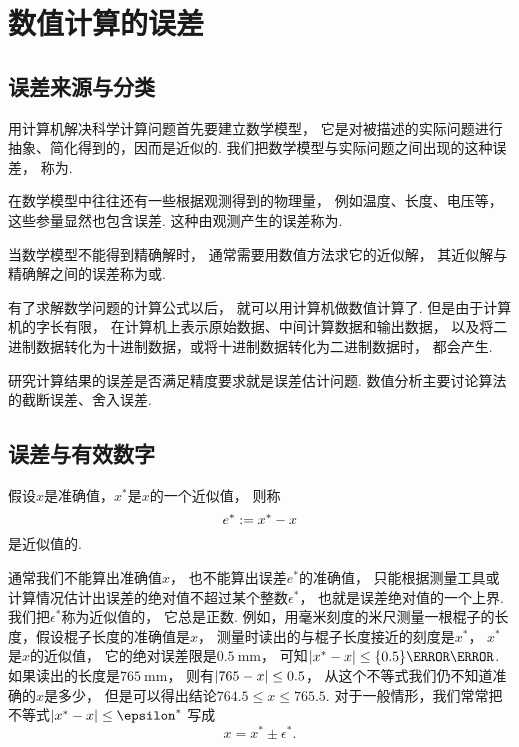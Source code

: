 \section{数值计算的误差}
\subsection{误差来源与分类}
用计算机解决科学计算问题首先要建立数学模型，
它是对被描述的实际问题进行抽象、简化得到的，因而是近似的.
我们把数学模型与实际问题之间出现的这种误差，
称为.

在数学模型中往往还有一些根据观测得到的物理量，
例如温度、长度、电压等，
这些参量显然也包含误差.
这种由观测产生的误差称为.

当数学模型不能得到精确解时，
通常需要用数值方法求它的近似解，
其近似解与精确解之间的误差称为或.

有了求解数学问题的计算公式以后，
就可以用计算机做数值计算了.
但是由于计算机的字长有限，
在计算机上表示原始数据、中间计算数据和输出数据，
以及将二进制数据转化为十进制数据，或将十进制数据转化为二进制数据时，
都会产生.

研究计算结果的误差是否满足精度要求就是误差估计问题.
数值分析主要讨论算法的截断误差、舍入误差.

\subsection{误差与有效数字}
假设\(x\)是准确值，\(x^*\)是\(x\)的一个近似值，
则称\begin{equation}
	e^* := x^* - x
\end{equation}
是近似值的.

通常我们不能算出准确值\(x\)，
也不能算出误差\(e^*\)的准确值，
只能根据测量工具或计算情况估计出误差的绝对值不超过某个整数\(\epsilon^*\)，
也就是误差绝对值的一个上界.
我们把\(\epsilon^*\)称为近似值的，
它总是正数.
例如，用毫米刻度的米尺测量一根棍子的长度，假设棍子长度的准确值是\(x\)，
测量时读出的与棍子长度接近的刻度是\(x^*\)，
\(x^*\)是\(x\)的近似值，
它的绝对误差限是\(\qty{0.5}{\milli\meter}\)，
可知\(\abs{x^* - x} \leq \qty{0.5}{\milli\meter}\).
如果读出的长度是\(\qty{765}{\milli\meter}\)，
则有\(\abs{765-x} \leq 0.5\)，
从这个不等式我们仍不知道准确的\(x\)是多少，
但是可以得出结论\(764.5 \leq x \leq 765.5\).
对于一般情形，我们常常把不等式\(\abs{x^* - x} \leq \epsilon^*\)
写成\begin{equation}
	x = x^* \pm \epsilon^*.
\end{equation}

